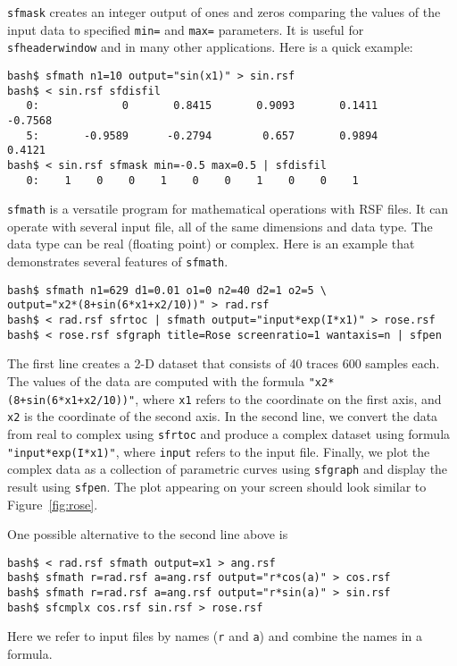 \noindent\doublebox{\parbox{\textwidth}{
    
  }}

\texttt{sfmask} creates an integer output of ones and zeros comparing
the values of the input data to specified \texttt{min=} and
\texttt{max=} parameters. It is useful for \texttt{sfheaderwindow} and
in many other applications. Here is a quick example:
\begin{verbatim}
bash$ sfmath n1=10 output="sin(x1)" > sin.rsf
bash$ < sin.rsf sfdisfil
   0:             0       0.8415       0.9093       0.1411      -0.7568
   5:       -0.9589      -0.2794        0.657       0.9894       0.4121
bash$ < sin.rsf sfmask min=-0.5 max=0.5 | sfdisfil
   0:    1    0    0    1    0    0    1    0    0    1
\end{verbatim}

\noindent\doublebox{\parbox{\textwidth}{
    
  }}


\texttt{sfmath} is a versatile program for mathematical operations
with RSF files. It can operate with several input file, all of the
same dimensions and data type. The data type can be real (floating
point) or complex. Here is an example that demonstrates several
features of \texttt{sfmath}.
\begin{verbatim}
bash$ sfmath n1=629 d1=0.01 o1=0 n2=40 d2=1 o2=5 \
output="x2*(8+sin(6*x1+x2/10))" > rad.rsf
bash$ < rad.rsf sfrtoc | sfmath output="input*exp(I*x1)" > rose.rsf
bash$ < rose.rsf sfgraph title=Rose screenratio=1 wantaxis=n | sfpen
\end{verbatim}

The first line creates a 2-D dataset that consists of 40 traces 600
samples each. The values of the data are computed with the formula
\verb#"x2*(8+sin(6*x1+x2/10))"#, where \texttt{x1} refers to the
coordinate on the first axis, and \texttt{x2} is the coordinate of the
second axis. In the second line, we convert the data from real to
complex using \texttt{sfrtoc} and produce a complex dataset using
formula \verb#"input*exp(I*x1)"#, where \texttt{input} refers to the
input file. Finally, we plot the complex data as a collection of
parametric curves using \texttt{sfgraph} and display the result using
\texttt{sfpen}.  The plot appearing on your screen should look similar
to Figure~\ref{fig:rose}.


One possible alternative to the second line above is
\begin{verbatim}
bash$ < rad.rsf sfmath output=x1 > ang.rsf
bash$ sfmath r=rad.rsf a=ang.rsf output="r*cos(a)" > cos.rsf
bash$ sfmath r=rad.rsf a=ang.rsf output="r*sin(a)" > sin.rsf
bash$ sfcmplx cos.rsf sin.rsf > rose.rsf
\end{verbatim}
Here we refer to input files by names (\texttt{r} and \texttt{a}) and combine the names in a formula.

